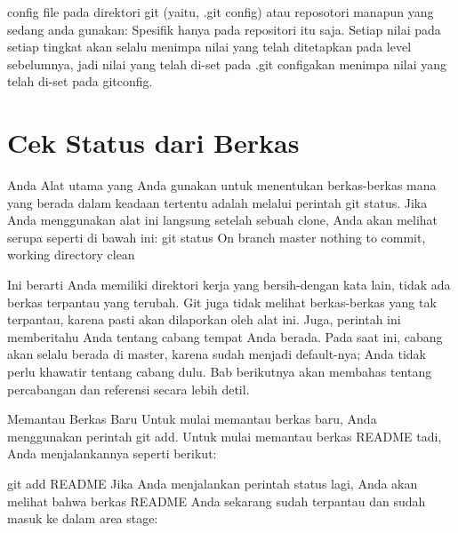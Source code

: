 {{{\vspace{\baselineskip}
\noindent 
{\fontsize{14pt}{14pt}\selectfont config file pada direktori git (yaitu, $  $.git config) atau reposotori manapun yang sedang anda gunakan: Spesifik hanya pada repositori itu saja. Setiap nilai pada setiap tingkat akan selalu menimpa nilai yang telah ditetapkan pada level sebelumnya, jadi nilai yang telah di-set pada $  $.git configakan menimpa nilai yang telah di-set pada $  $gitconfig. \\} \par

\noindent
{\fontsize{14pt}{14pt}\section {Cek Status dari Berkas} 
	
	\vspace{14pt}
	\noindent
	{\fontsize{14pt}{14pt}\selectfont Anda
	Alat utama yang Anda gunakan untuk menentukan berkas-berkas mana yang berada dalam keadaan tertentu adalah melalui perintah git status. Jika Anda menggunakan alat ini langsung setelah sebuah clone, Anda akan melihat serupa seperti di bawah ini:
	git status
	On branch master
	nothing to commit, working directory clean
	
	\vspace{14pt}
	\noindent
	{\fontsize{14pt}{14pt}\selectfont 
	Ini berarti Anda memiliki direktori kerja yang bersih-dengan kata lain, tidak ada berkas terpantau yang terubah. Git juga tidak melihat berkas-berkas yang tak terpantau, karena pasti akan dilaporkan oleh alat ini. Juga, perintah ini memberitahu Anda tentang cabang tempat Anda berada. Pada saat ini, cabang akan selalu berada di master, karena sudah menjadi default-nya; Anda tidak perlu khawatir tentang cabang dulu. Bab berikutnya akan membahas tentang percabangan dan referensi secara lebih detil.
	
	\vspace{14pt}
	\noindent
	{\fontsize{14pt}{14pt}\selectfont
	Memantau Berkas Baru
	Untuk mulai memantau berkas baru, Anda menggunakan perintah git add. Untuk mulai memantau berkas README tadi, Anda menjalankannya seperti berikut:
	
	\vspace{14pt}
	\noindent
	{\fontsize{14pt}{14pt}\selectfont
	git add README
	Jika Anda menjalankan perintah status lagi, Anda akan melihat bahwa berkas README Anda sekarang sudah terpantau dan sudah masuk ke dalam area stage:
	\begin{verbatim}
		

\end{verbatim}}}}}}}}}
